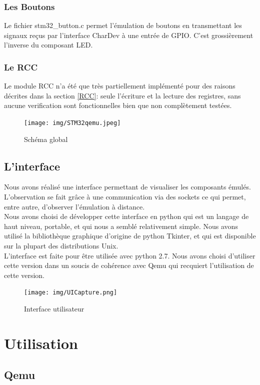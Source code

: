 \documentclass{article}
\begin{document}
		\subsubsection{Les Boutons}
			Le fichier stm32\_button.c permet l'émulation de boutons en transmettant les signaux reçus par l'interface CharDev à une entrée de GPIO.
			C'est grossièrement l'inverse du composant LED.
		\subsubsection{Le RCC}
			Le module RCC n'a été que très partiellement implémenté pour des raisons décrites dans la section \ref{RCC}: seule l'écriture et la lecture des registres, 
			sans aucune verification sont fonctionnelles bien que non complètement testées.
			
	\begin{figure}
	  \caption{Schéma global}
	  \centering
	 \texttt{[image: img/STM32qemu.jpeg]}
	\end{figure}

			
	\subsection{L'interface}
		Nous avons réalisé une interface permettant de visualiser les composants émulés. L'observation se fait grâce à une communication
		via des sockets ce qui permet, entre autre, d'observer l'émulation à distance.\\
		Nous avons choisi de développer cette interface en python qui est un langage de haut niveau, portable, et qui nous a semblé 
		relativement simple. Nous avons utilisé la bibliothèque graphique d'origine de python Tkinter, et qui est disponible sur 
		la plupart des distributions Unix.\\
		L'interface est faite pour être utilisée avec python 2.7. Nous avons choisi d'utiliser cette version dans un soucis de 
		cohérence avec Qemu qui recquiert l'utilisation de cette version.
		
		\begin{figure}[h]
		  \centering
		  \texttt{[image: img/UICapture.png]}
		  \caption{Interface utilisateur}
		\end{figure}

\section{Utilisation}	
	\subsection{Qemu}
\end{document}
